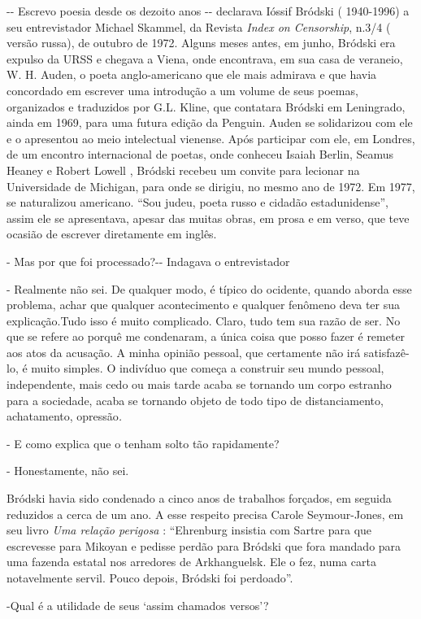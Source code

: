 -\/- Escrevo poesia desde os dezoito anos -\/- declarava Ióssif Bródski
( 1940-1996) a seu entrevistador Michael Skammel, da Revista \emph{Index
on Censorship}, n.3/4 ( versão russa), de outubro de 1972. Alguns meses
antes, em junho, Bródski era expulso da URSS e chegava a Viena, onde
encontrava, em sua casa de veraneio, W. H. Auden, o poeta
anglo-americano que ele mais admirava e que havia concordado em escrever
uma introdução a um volume de seus poemas, organizados e traduzidos por
G.L. Kline, que contatara Bródski em Leningrado, ainda em 1969, para uma
futura edição da Penguin. Auden se solidarizou com ele e o apresentou ao
meio intelectual vienense. Após participar com ele, em Londres, de um
encontro internacional de poetas, onde conheceu Isaiah Berlin, Seamus
Heaney e Robert Lowell , Bródski recebeu um convite para lecionar na
Universidade de Michigan, para onde se dirigiu, no mesmo ano de 1972. Em
1977, se naturalizou americano. ``Sou judeu, poeta russo e cidadão
estadunidense'', assim ele se apresentava, apesar das muitas obras, em
prosa e em verso, que teve ocasião de escrever diretamente em inglês.

- Mas por que foi processado?-\/- Indagava o entrevistador

- Realmente não sei. De qualquer modo, é típico do ocidente, quando
aborda esse problema, achar que qualquer acontecimento e qualquer
fenômeno deva ter sua explicação.Tudo isso é muito complicado. Claro,
tudo tem sua razão de ser. No que se refere ao porquê me condenaram, a
única coisa que posso fazer é remeter aos atos da acusação. A minha
opinião pessoal, que certamente não irá satisfazê-lo, é muito simples. O
indivíduo que começa a construir seu mundo pessoal, independente, mais
cedo ou mais tarde acaba se tornando um corpo estranho para a sociedade,
acaba se tornando objeto de todo tipo de distanciamento, achatamento,
opressão\emph{.}

- E como explica que o tenham solto tão rapidamente?

- Honestamente, não sei.

Bródski havia sido condenado a cinco anos de trabalhos forçados, em
seguida reduzidos a cerca de um ano. A esse respeito precisa Carole
Seymour-Jones, em seu livro \emph{Uma relação perigosa} : ``Ehrenburg
insistia com Sartre para que escrevesse para Mikoyan e pedisse perdão
para Bródski que fora mandado para uma fazenda estatal nos arredores de
Arkhanguelsk. Ele o fez, numa carta notavelmente servil. Pouco depois,
Bródski foi perdoado''.

-Qual é a utilidade de seus `assim chamados versos'?

